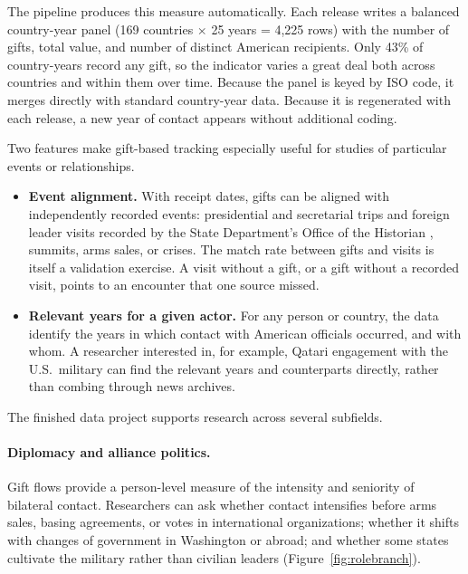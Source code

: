 \documentclass[11pt]{article}
\makeatletter
\renewcommand\section{\@startsection{section}{1}{\z@}{-3.0ex plus -1ex minus -.2ex}{1.5ex plus .2ex}{\normalfont\large\bfseries\MakeUppercase}}
\makeatother
\begin{document}
The pipeline produces this measure automatically. Each release writes a balanced country-year panel (169 countries $\times$ 25 years = 4,225 rows) with the number of gifts, total value, and number of distinct American recipients. Only 43\% of country-years record any gift, so the indicator varies a great deal both across countries and within them over time. Because the panel is keyed by ISO code, it merges directly with standard country-year data. Because it is regenerated with each release, a new year of contact appears without additional coding.

Two features make gift-based tracking especially useful for studies of particular events or relationships.
\begin{itemize}
\item \textbf{Event alignment.} With receipt dates, gifts can be aligned with independently recorded events: presidential and secretarial trips and foreign leader visits recorded by the State Department's Office of the Historian \citep{historian}, summits, arms sales, or crises. The match rate between gifts and visits is itself a validation exercise. A visit without a gift, or a gift without a recorded visit, points to an encounter that one source missed.
\item \textbf{Relevant years for a given actor.} For any person or country, the data identify the years in which contact with American officials occurred, and with whom. A researcher interested in, for example, Qatari engagement with the U.S.\ military can find the relevant years and counterparts directly, rather than combing through news archives.
\end{itemize}

\section{Applications}\label{sec:apps}

The finished data project supports research across several subfields.

\paragraph{Diplomacy and alliance politics.} Gift flows provide a person-level measure of the intensity and seniority of bilateral contact. Researchers can ask whether contact intensifies before arms sales, basing agreements, or votes in international organizations; whether it shifts with changes of government in Washington or abroad; and whether some states cultivate the military rather than civilian leaders (Figure~\ref{fig:rolebranch}).
\end{document}
